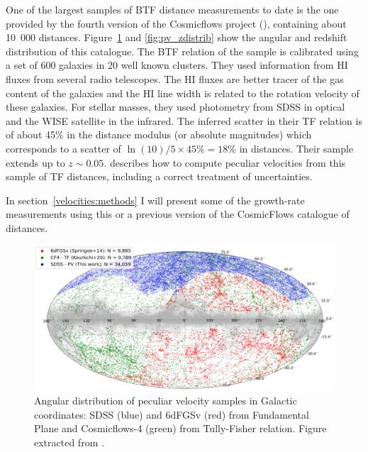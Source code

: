    One of the largest samples of BTF distance measurements to date is the one provided by 
    the fourth version of the Cosmicflows project (\cite{kourkchiCosmicflows4BaryonicTullyFisher2022}), 
    containing about 10~000 distances. 
    Figure~\ref{fig:pv_footprint} and \ref{fig:pv_zdistrib} show the angular and redshift distribution 
    of this catalogue. 
    The BTF relation of the sample is calibrated using a set of 600 galaxies in 20 well known clusters.
    They used information from HI fluxes from several radio telescopes. The HI fluxes are better 
    tracer of the gas content of the galaxies and the HI line width is related to the rotation 
    velocity of these galaxies. For stellar masses, they used photometry from SDSS in optical 
    and the WISE satellite in the infrared. 
    The inferred scatter in their TF relation is of about 45\% in the distance modulus (or absolute magnitudes) 
    which corresponds to a scatter of $\ln(10)/5 \times 45$\%$ = 18$\% in distances.  
    Their sample extends up to $z \sim 0.05$. 
    \cite{hoffmanCosmicflowsDistanceModuli2021} describes how to compute peculiar velocities 
    from this sample of TF distances, including a correct treatment of uncertainties. 

    In section~\ref{velocities:methods} I will present some of the growth-rate measurements 
    using this or a previous version of the CosmicFlows catalogue of distances. 


    \begin{figure}
        \centering 
        \includegraphics[width=\textwidth]{fig/velocities/pv_footprints.png}
        \caption{Angular distribution of peculiar velocity samples in Galactic coordinates:
        SDSS (blue) and 6dFGSv (red) from Fundamental Plane and 
        Cosmicflows-4 (green) from Tully-Fisher relation.  
        Figure extracted from \cite{howlettSloanDigitalSky2022a}. }
        \label{fig:pv_footprint}
    \end{figure}


